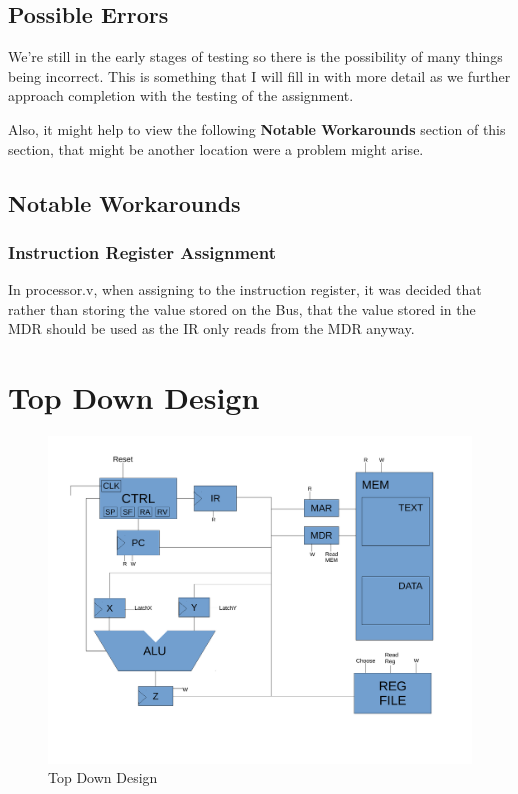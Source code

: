\documentclass[conference]{IEEEtran}
\begin{document}
\subsection{Possible Errors}
We're still in the early stages of testing so there is the possibility of many things 
being incorrect. This is something that I will fill in with more detail as we 
further approach completion with the testing of the assignment.

Also, it might help to view the following \textbf{Notable Workarounds} section
of this section, that might be another location were a problem might arise.

\subsection{Notable Workarounds}
\subsubsection{Instruction Register Assignment}
In processor.v, when assigning to the instruction register, it was decided 
that rather than storing the value stored on the Bus, that the value stored
in the MDR should be used as the IR only reads from the MDR anyway.



\clearpage 
\section{Top Down Design}
\begin{figure}[!t]
\centering
\includegraphics[width=\textwidth]{TopDownDesignDraftp1.pdf}
\caption{Top Down Design}
\label{fig_sim}
\end{figure}
\end{document}
